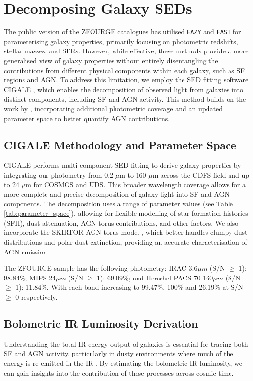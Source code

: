 \section{Decomposing Galaxy SEDs} \label{Sec: CIGALE}
The public version of the ZFOURGE catalogues has utilised \texttt{EAZY} \citep{brammer_eazy_2008} and \texttt{FAST} \citep{kriek_ultra-deep_2009} for parameterising galaxy properties, primarily focusing on photometric redshifts, stellar masses, and SFRs. However, while effective, these methods provide a more generalised view of galaxy properties without entirely disentangling the contributions from different physical components within each galaxy, such as SF regions and AGN. To address this limitation, we employ the SED fitting software CIGALE \citep{boquien_cigale_2019}, which enables the decomposition of observed light from galaxies into distinct components, including SF and AGN activity. This method builds on the work by \cite{cowley_decoupled_2018}, incorporating additional photometric coverage and an updated parameter space to better quantify AGN contributions.

\subsection{CIGALE Methodology and Parameter Space} \label{Sec: CIGALE_Parameters}
CIGALE performs multi-component SED fitting to derive galaxy properties by integrating our photometry from 0.2 $\mu$m to 160 $\mu$m across the CDFS field and up to 24 $\mu$m for COSMOS and UDS. This broader wavelength coverage allows for a more complete and precise decomposition of galaxy light into SF and AGN components. The decomposition uses a range of parameter values (see Table \ref{tab:parameter_space}), allowing for flexible modelling of star formation histories (SFH), dust attenuation, AGN torus contributions, and other factors. We also incorporate the SKIRTOR AGN torus model \citep{stalevski_dust_2016}, which better handles clumpy dust distributions and polar dust extinction, providing an accurate characterisation of AGN emission.

The ZFOURGE sample has the following photometry: IRAC 3.6$\mu m$ (S/N $\geq$ 1): 98.84\%; MIPS 24$\mu m$ (S/N $\geq$ 1): 69.09\%; and Herschel PACS 70-160$\mu m$ (S/N $\geq$ 1): 11.84\%. With each band increasing to 99.47\%, 100\% and 26.19\% at S/N $\geq$ 0 respectively. 

\subsection{Bolometric IR Luminosity Derivation} \label{Sec: IR_Luminosity}
Understanding the total IR energy output of galaxies is essential for tracing both SF and AGN activity, particularly in dusty environments where much of the energy is re-emitted in the IR \citep{fu_decomposing_2010}. By estimating the bolometric IR luminosity, we can gain insights into the contribution of these processes across cosmic time. 

